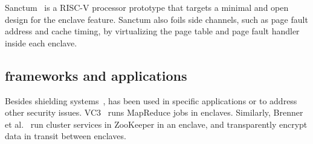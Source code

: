 Sanctum~\cite{costan2016sanctum} is a RISC-V processor prototype that targets a minimal and open design for the enclave feature.
Sanctum also foils side channels, such as page fault address and cache timing, by virtualizing the page table and page fault handler inside each enclave.



\subsection{\sgx{} frameworks and applications}

Besides shielding systems~\cite{baumann14haven,osdi16scone,shinde17panoply},
\sgx{} has been used in specific applications or to address other security issues.
VC3~\cite{vc3} runs MapReduce jobs in \sgx{} enclaves.
Similarly, Brenner et al.~\cite{zookeeper}
run cluster services in ZooKeeper in an enclave, and transparently encrypt data in transit between enclaves.
